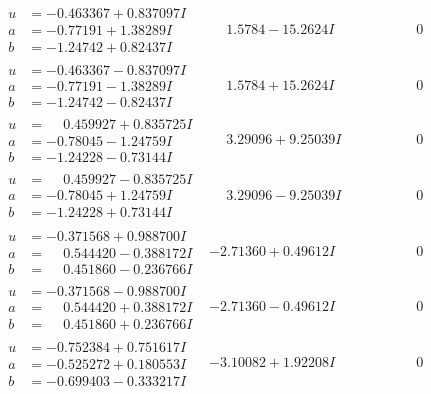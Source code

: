 \documentclass[1p]{elsarticle_modified}
\theoremstyle{definition}
\begin{document}
$$\begin{array}{c|c|c}
\begin{aligned}
u &= -0.463367 + 0.837097 I \\
a &= -0.77191 + 1.38289 I \\
b &= -1.24742 + 0.82437 I\end{aligned}
 & \phantom{-}1.5784 - 15.2624 I & \phantom{-0.000000 } 0 \\ \hline\begin{aligned}
u &= -0.463367 - 0.837097 I \\
a &= -0.77191 - 1.38289 I \\
b &= -1.24742 - 0.82437 I\end{aligned}
 & \phantom{-}1.5784 + 15.2624 I & \phantom{-0.000000 } 0 \\ \hline\begin{aligned}
u &= \phantom{-}0.459927 + 0.835725 I \\
a &= -0.78045 - 1.24759 I \\
b &= -1.24228 - 0.73144 I\end{aligned}
 & \phantom{-}3.29096 + 9.25039 I & \phantom{-0.000000 } 0 \\ \hline\begin{aligned}
u &= \phantom{-}0.459927 - 0.835725 I \\
a &= -0.78045 + 1.24759 I \\
b &= -1.24228 + 0.73144 I\end{aligned}
 & \phantom{-}3.29096 - 9.25039 I & \phantom{-0.000000 } 0 \\ \hline\begin{aligned}
u &= -0.371568 + 0.988700 I \\
a &= \phantom{-}0.544420 - 0.388172 I \\
b &= \phantom{-}0.451860 - 0.236766 I\end{aligned}
 & -2.71360 + 0.49612 I & \phantom{-0.000000 } 0 \\ \hline\begin{aligned}
u &= -0.371568 - 0.988700 I \\
a &= \phantom{-}0.544420 + 0.388172 I \\
b &= \phantom{-}0.451860 + 0.236766 I\end{aligned}
 & -2.71360 - 0.49612 I & \phantom{-0.000000 } 0 \\ \hline\begin{aligned}
u &= -0.752384 + 0.751617 I \\
a &= -0.525272 + 0.180553 I \\
b &= -0.699403 - 0.333217 I\end{aligned}
 & -3.10082 + 1.92208 I & \phantom{-0.000000 } 0 \\ \hline\begin{aligned}

\end{aligned}
\end{array}$$
\end{document}
